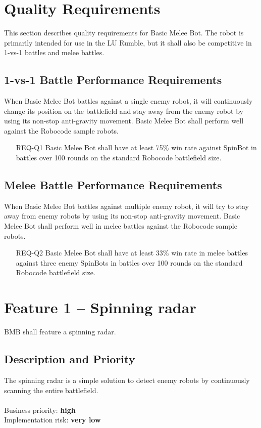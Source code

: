 \documentclass{scrreprt}
\begin{document}
\section{Quality Requirements}
This section describes quality requirements for Basic Melee Bot. The robot is primarily intended for use in the LU Rumble, but it shall also be competitive in 1-vs-1 battles and melee battles.

\subsection{1-vs-1 Battle Performance Requirements}
When Basic Melee Bot battles against a single enemy robot, it will continuously change its position on the battlefield and stay away from the enemy robot by using its non-stop anti-gravity movement. Basic Melee Bot shall perform well against the Robocode sample robots.

\begin{itemize}
\item[REQ-Q1] Basic Melee Bot shall have at least 75\% win rate against SpinBot in battles over 100 rounds on the standard Robocode battlefield size.
\end{itemize}

\subsection{Melee Battle Performance Requirements}
When Basic Melee Bot battles against multiple enemy robot, it will try to stay away from enemy robots by using its non-stop anti-gravity movement. Basic Melee Bot shall perform well in melee battles against the Robocode sample robots.

\begin{itemize}
\item[REQ-Q2] Basic Melee Bot shall have at least 33\% win rate in melee battles against three enemy SpinBots in battles over 100 rounds on the standard Robocode battlefield size.
\end{itemize}

\section{Feature 1 -- Spinning radar}
BMB shall feature a spinning radar.

\subsection{Description and Priority}
The spinning radar is a simple solution to detect enemy robots by continuously scanning the entire battlefield.\\\\Business priority: \textbf{high}\\
Implementation risk: \textbf{very low}
\end{document}
